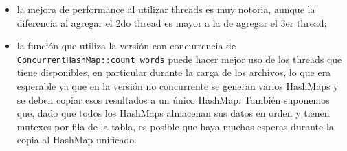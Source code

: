 \begin{itemize}

	\item la mejora de performance al utilizar threads es muy notoria, aunque la diferencia al agregar el 2do thread es mayor a la de agregar el 3er thread;

	\item la función que utiliza la versión con concurrencia de \texttt{ConcurrentHashMap::count\_words} puede hacer mejor uso de los threads que tiene disponibles, en particular durante la carga de los archivos, lo que era esperable ya que en la versión no concurrente se generan varios HashMaps y se deben copiar esos resultados a un único HashMap. También suponemos que, dado que todos los HashMaps almacenan sus datos en orden y tienen mutexes por fila de la tabla, es posible que haya muchas esperas durante la copia al HashMap unificado.

\end{itemize}